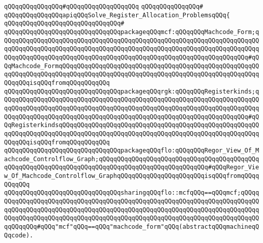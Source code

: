 \verb|qQQqqQQqqQQqqQQq#qQQqqQQqqQQqqQQqqQQq|\newline
\verb|qQQqqQQqqQQqqQQq#|\newline
\verb|qQQqqQQqqQQqqQQqapiqQQqSolve_Register_Allocation_ProblemsqQQq{|\newline
\verb|qQQqqQQqqQQqqQQqqQQqqQQqqQQqqQQq#|\newline
\verb|qQQqqQQqqQQqqQQqqQQqqQQqqQQqqQQqpackageqQQqmcf:qQQqqQQqMachcode_Form;qQQqqQQqqQQqqQQqqQQqqQQqqQQqqQQqqQQqqQQqqQQqqQQqqQQqqQQqqQQqqQQqqQQqqQQqqQQqqQQqqQQqqQQqqQQqqQQqqQQqqQQqqQQqqQQqqQQqqQQqqQQqqQQqqQQqqQQqqQQqqQQqqQQqqQQqqQQqqQQqqQQqqQQqqQQqqQQqqQQqqQQqqQQqqQQqqQQqqQQqqQQqqQQq#qQQqMachcode_FormqQQqqQQqqQQqqQQqqQQqqQQqqQQqqQQqqQQqqQQqqQQqqQQqqQQqqQQqqQQqqQQqqQQqqQQqqQQqqQQqqQQqqQQqqQQqqQQqqQQqqQQqqQQqqQQqqQQqqQQqqQQqqQQqqQQqisqQQqfromqQQqqQQqqQQq|\newline
\verb|qQQqqQQqqQQqqQQqqQQqqQQqqQQqqQQqpackageqQQqrgk:qQQqqQQqRegisterkinds;qQQqqQQqqQQqqQQqqQQqqQQqqQQqqQQqqQQqqQQqqQQqqQQqqQQqqQQqqQQqqQQqqQQqqQQqqQQqqQQqqQQqqQQqqQQqqQQqqQQqqQQqqQQqqQQqqQQqqQQqqQQqqQQqqQQqqQQqqQQqqQQqqQQqqQQqqQQqqQQqqQQqqQQqqQQqqQQqqQQqqQQqqQQqqQQqqQQqqQQqqQQqqQQq#qQQqRegisterkindsqQQqqQQqqQQqqQQqqQQqqQQqqQQqqQQqqQQqqQQqqQQqqQQqqQQqqQQqqQQqqQQqqQQqqQQqqQQqqQQqqQQqqQQqqQQqqQQqqQQqqQQqqQQqqQQqqQQqqQQqqQQqqQQqqQQqisqQQqfromqQQqqQQqqQQq|\newline
\verb|qQQqqQQqqQQqqQQqqQQqqQQqqQQqqQQqpackageqQQqflo:qQQqqQQqRegor_View_Of_Machcode_Controlflow_Graph;qQQqqQQqqQQqqQQqqQQqqQQqqQQqqQQqqQQqqQQqqQQqqQQqqQQqqQQqqQQqqQQqqQQqqQQqqQQqqQQqqQQqqQQqqQQqqQQqqQQq#qQQqRegor_View_Of_Machcode_Controlflow_GraphqQQqqQQqqQQqqQQqqQQqqQQqisqQQqfromqQQqqQQqqQQq|\newline
\newline
\verb|qQQqqQQqqQQqqQQqqQQqqQQqqQQqqQQqsharingqQQqflo::mcfqQQq==qQQqmcf;qQQqqQQqqQQqqQQqqQQqqQQqqQQqqQQqqQQqqQQqqQQqqQQqqQQqqQQqqQQqqQQqqQQqqQQqqQQqqQQqqQQqqQQqqQQqqQQqqQQqqQQqqQQqqQQqqQQqqQQqqQQqqQQqqQQqqQQqqQQqqQQqqQQqqQQqqQQqqQQqqQQqqQQqqQQqqQQqqQQqqQQqqQQqqQQqqQQqqQQqqQQqqQQqqQQqqQQqqQQqqQQq#qQQq"mcf"qQQq==qQQq"machcode_form"qQQq(abstractqQQqmachineqQQqcode).|\newline

